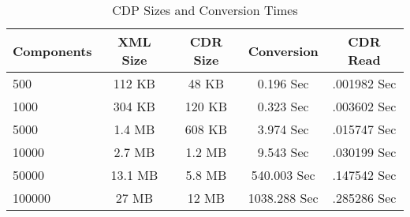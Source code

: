 \begin{table*}[htb]
  \begin{center}
  \caption{CDP Sizes and Conversion Times}
  \scriptsize
  \label{tab:conversion}
    \begin{tabular}{ | l || c | c | c | c |}                                 \hline
      Components  & XML Size    & CDR Size  & Conversion   & CDR Read     \\ \hline\hline
      500         & 112  KB     & 48 KB     & 0.196 Sec    & .001982 Sec  \\ \hline
      1000        & 304  KB     & 120 KB    & 0.323 Sec    & .003602 Sec  \\ \hline
      5000        & 1.4  MB     & 608 KB    & 3.974 Sec    & .015747 Sec  \\ \hline
      10000       & 2.7  MB     & 1.2 MB    & 9.543 Sec    & .030199 Sec  \\ \hline
      50000       & 13.1 MB     & 5.8 MB    & 540.003 Sec  & .147542 Sec  \\ \hline
      100000      & 27 MB       & 12 MB     & 1038.288 Sec & .285286 Sec  \\ \hline
    \end{tabular}
  \end{center}
\end{table*}
